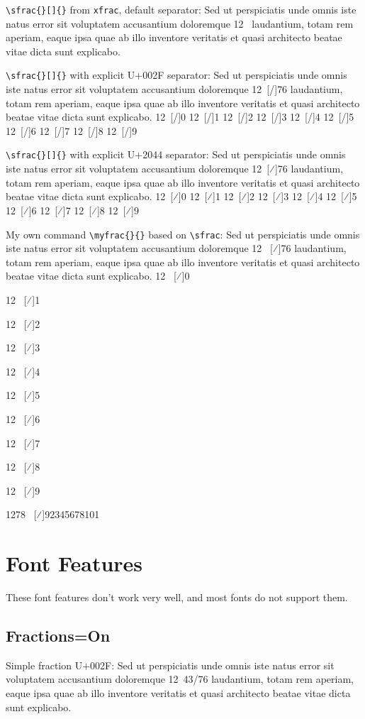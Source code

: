 \documentclass[12pt,twoside,a4paper]{book}
\newcommand{\myfrac}[2]{%
\sfrac{#1}[\hspace{0.25ex}⁄\hspace{0.1ex}]{#2}%
}
\begin{document}
\verb+\sfrac{}[]{}+ from \verb+xfrac+, default separator: Sed ut perspiciatis unde omnis iste natus error sit voluptatem accusantium doloremque 12~ laudantium, totam rem aperiam, eaque ipsa quae ab illo inventore veritatis et quasi architecto beatae vitae dicta sunt explicabo.

\verb+\sfrac{}[]{}+ with explicit U+002F separator: Sed ut perspiciatis unde omnis iste natus error sit voluptatem accusantium doloremque
12~[/]{76}
laudantium, totam rem aperiam, eaque ipsa quae ab illo inventore veritatis et quasi architecto beatae vitae dicta sunt explicabo.
12~[/]{0}
12~[/]{1}
12~[/]{2}
12~[/]{3}
12~[/]{4}
12~[/]{5}
12~[/]{6}
12~[/]{7}
12~[/]{8}
12~[/]{9}

\verb+\sfrac{}[]{}+ with explicit U+2044 separator: Sed ut perspiciatis unde omnis iste natus error sit voluptatem accusantium doloremque
12~[⁄]{76}
laudantium, totam rem aperiam, eaque ipsa quae ab illo inventore veritatis et quasi architecto beatae vitae dicta sunt explicabo.
12~[⁄]{0}
12~[⁄]{1}
12~[⁄]{2}
12~[⁄]{3}
12~[⁄]{4}
12~[⁄]{5}
12~[⁄]{6}
12~[⁄]{7}
12~[⁄]{8}
12~[⁄]{9}

My own command \verb+\myfrac{}{}+ based on \verb+\sfrac+: Sed ut perspiciatis unde omnis iste natus error sit voluptatem accusantium doloremque 12~\myfrac{43}{76} laudantium, totam rem aperiam, eaque ipsa quae ab illo inventore veritatis et quasi architecto beatae vitae dicta sunt explicabo.
12~\myfrac{1}{0}
12~\myfrac{2}{1}
12~\myfrac{3}{2}
12~\myfrac{4}{3}
12~\myfrac{5}{4}
12~\myfrac{6}{5}
12~\myfrac{7}{6}
12~\myfrac{8}{7}
12~\myfrac{9}{8}
12~\myfrac{10}{9}
1278~\myfrac{1023456798}{92345678101}

\section{Font Features}
These font features don't work very well, and most fonts do not support them.

\subsection{Fractions=On}

Simple fraction U+002F: Sed ut perspiciatis unde omnis iste natus error sit voluptatem accusantium doloremque 12~43/76 laudantium, totam rem aperiam, eaque ipsa quae ab illo inventore veritatis et quasi architecto beatae vitae dicta sunt explicabo.
\end{document}
